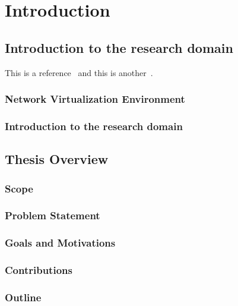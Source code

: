 \chapter{Introduction}
\label{Chapter1}
 

\section{Introduction to the research domain}
\label{sec:IntroductionToTheResearchDomain}
This is a reference~\cite{graph-based-gmt} and this is another~\cite{information-model}.

\subsection{Network Virtualization Environment}
{\todo}

\subsection{Introduction to the research domain}
\label{sec:IntroductionToTheResearchDomain}

\section{Thesis Overview}
\label{sec:ThesisOverview}

\subsection{Scope}
\label{sec:Scope}

\subsection{Problem Statement}
\label{sec:ProblemStatement}

\subsection{Goals and Motivations}
\label{sec:GoalsAndMotivations}

\subsection{Contributions}
\label{sec:Contributions}

\subsection{Outline}
\label{sec:Outline}

 
